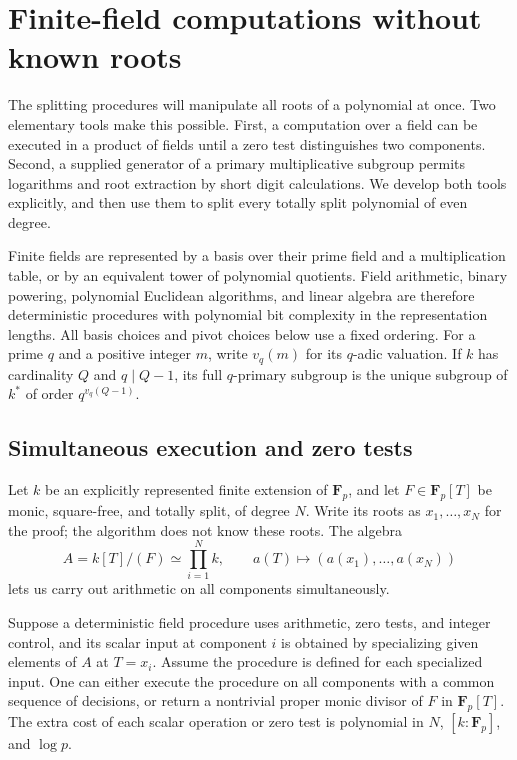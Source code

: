 \section{Finite-field computations without known roots}
\label{ff:section}

The splitting procedures will manipulate all roots of a polynomial at once.
Two elementary tools make this possible.  First, a computation over a field
can be executed in a product of fields until a zero test distinguishes two
components.  Second, a supplied generator of a primary multiplicative subgroup
permits logarithms and root extraction by short digit calculations.  We develop
both tools explicitly, and then use them to split every totally split polynomial
of even degree.

Finite fields are represented by a basis over their prime field and a
multiplication table, or by an equivalent tower of polynomial quotients.
Field arithmetic, binary powering, polynomial Euclidean algorithms, and linear
algebra are therefore deterministic procedures with polynomial bit complexity
in the representation lengths.  All basis choices and pivot choices below use
a fixed ordering.  For a prime $q$ and a positive integer $m$, write
$v_q(m)$ for its $q$-adic valuation.  If $k$ has cardinality $Q$ and
$q\mid Q-1$, its full $q$-primary subgroup is the unique subgroup of
$k^*$ of order $q^{v_q(Q-1)}$.

\subsection{Simultaneous execution and zero tests}

Let $k$ be an explicitly represented finite extension of $\mathbf F_p$, and let
$F\in\mathbf F_p[T]$ be monic, square-free, and totally split, of degree $N$.
Write its roots as $x_1,\ldots,x_N$ for the proof; the algorithm does not know
these roots.  The algebra
\begin{equation}
 A=k[T]/(F)\simeq\prod_{i=1}^N k,
 \qquad a(T)\longmapsto(a(x_1),\ldots,a(x_N))
 \label{ff:product}
\end{equation}
lets us carry out arithmetic on all components simultaneously.

\begin{lemma}
\label{ff:simultaneous}
Suppose a deterministic field procedure uses arithmetic, zero tests, and
integer control, and its scalar input at component $i$ is obtained by
specializing given elements of $A$ at $T=x_i$.  Assume the procedure is
defined for each specialized input.  One can either execute the
procedure on all components with a common sequence of decisions, or return a
nontrivial proper monic divisor of $F$ in $\mathbf F_p[T]$.
The extra cost of each scalar operation or zero test is polynomial in
$N$, $[k:\mathbf F_p]$, and $\log p$.
\end{lemma}

